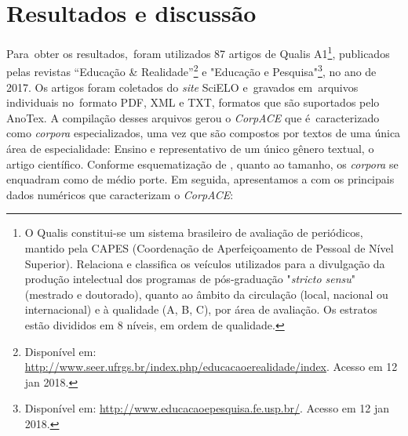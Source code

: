 \documentclass[portuguese]{textolivre}
\begin{document}
\section{Resultados e discussão}\label{sec-format-simple}
Para obter os resultados, foram utilizados 87 artigos de Qualis A1\footnote{O Qualis constitui-se um sistema brasileiro de avaliação de periódicos, mantido pela CAPES (Coordenação de Aperfeiçoamento de Pessoal de Nível Superior). Relaciona e classifica os veículos utilizados para a divulgação da produção intelectual dos programas de pós-graduação "\textit{stricto sensu}" (mestrado e doutorado), quanto ao âmbito da circulação (local, nacional ou internacional) e à qualidade (A, B, C), por área de avaliação. Os estratos estão divididos em 8 níveis, em ordem de qualidade.}, publicados pelas revistas “Educação \& Realidade”\footnote{Disponível em: \url{http://www.seer.ufrgs.br/index.php/educacaoerealidade/index}. Acesso em 12 jan 2018.} e "Educação e Pesquisa"\footnote{Disponível em: \url{http://www.educacaoepesquisa.fe.usp.br/}. Acesso em 12 jan 2018.}, no ano de 2017.  Os artigos foram coletados do \textit{site} SciELO e gravados em arquivos individuais no formato PDF, XML e TXT, formatos que são suportados pelo AnoTex. A compilação desses arquivos gerou o \textit{CorpACE} que é caracterizado como \textit{corpora} especializados, uma vez que são compostos por textos de uma única área de especialidade: Ensino e representativo de um único gênero textual, o artigo científico. Conforme esquematização de \textcite{sardinha_linguistica_2004}, quanto ao tamanho, os \textit{corpora} se enquadram como de médio porte. Em seguida, apresentamos a  com os principais dados numéricos que caracterizam o \textit{CorpACE}:
\end{document}
